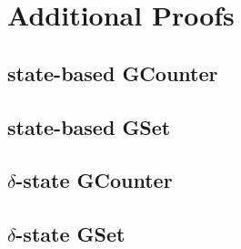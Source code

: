 \chapter{Additional Proofs}

\section{state-based GCounter \CRDT}
\label{sec:app-gcounter-comm-assoc}

\begin{figure}[H]
  
  \caption{\TODO}
\end{figure}

\begin{figure}[H]

\end{figure}

\section{state-based GSet \CRDT}
\label{sec:app-state-gset}

\begin{figure}[H]

\end{figure}

\section{$\delta$-state GCounter \CRDT}

\begin{figure}[H]

\end{figure}

\section{$\delta$-state GSet \CRDT}

\begin{figure}[H]

\end{figure}
